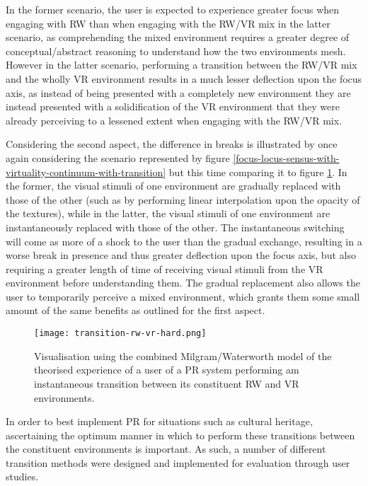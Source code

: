 In the former scenario, the user is expected to experience greater focus when engaging with RW than when engaging with the RW/VR mix in the latter scenario, as comprehending the mixed environment requires a greater degree of conceptual/abstract reasoning to understand how the two environments mesh. However in the latter scenario, performing a transition between the RW/VR mix and the wholly VR environment results in a much lesser deflection upon the focus axis, as instead of being presented with a completely new environment they are instead presented with a solidification of the VR environment that they were already perceiving to a lessened extent when engaging with the RW/VR mix.

Considering the second aspect, the difference in breaks is illustrated by once again considering the scenario represented by figure \ref{focus-locus-sensus-with-virtuality-continuum-with-transition} but this time comparing it to figure \ref{transition-rw-vr-hard.png}. In the former, the visual stimuli of one environment are gradually replaced with those of the other (such as by performing linear interpolation upon the opacity of the textures), while in the latter, the visual stimuli of one environment are instantaneously replaced with those of the other. The instantaneous switching will come as more of a shock to the user than the gradual exchange, resulting in a worse break in presence and thus greater deflection upon the focus axis, but also requiring a greater length of time of receiving visual stimuli from the VR environment before understanding them. The gradual replacement also allows the user to temporarily perceive a mixed environment, which grants them some small amount of the same benefits as outlined for the first aspect.

\begin{figure}[h]
	\begin{center}
		\texttt{[image: transition-rw-vr-hard.png]}
		\caption{Visualisation using the combined Milgram/Waterworth model of the theorised experience of a user of a PR system performing am instantaneous transition between its constituent RW and VR environments.}
		\label{transition-rw-vr-hard.png}
	\end{center}
\end{figure}

In order to best implement PR for situations such as cultural heritage, ascertaining the optimum manner in which to perform these transitions between the constituent environments is important. As such, a number of different transition methods were designed and implemented for evaluation through user studies.


